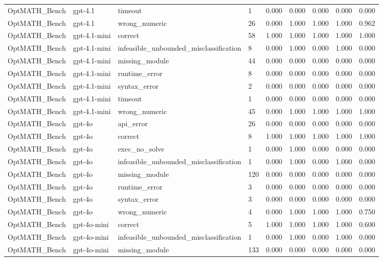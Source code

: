 \begin{table}[t]
\begin{tabular}{lllllllll}
OptMATH\_Bench & gpt-4.1 & timeout & 1 & 0.000 & 0.000 & 0.000 & 0.000 & 0.000 \\
OptMATH\_Bench & gpt-4.1 & wrong\_numeric & 26 & 0.000 & 1.000 & 1.000 & 1.000 & 0.962 \\
OptMATH\_Bench & gpt-4.1-mini & correct & 58 & 1.000 & 1.000 & 1.000 & 1.000 & 1.000 \\
OptMATH\_Bench & gpt-4.1-mini & infeasible\_unbounded\_misclassification & 8 & 0.000 & 1.000 & 0.000 & 1.000 & 0.000 \\
OptMATH\_Bench & gpt-4.1-mini & missing\_module & 44 & 0.000 & 0.000 & 0.000 & 0.000 & 0.000 \\
OptMATH\_Bench & gpt-4.1-mini & runtime\_error & 8 & 0.000 & 0.000 & 0.000 & 0.000 & 0.000 \\
OptMATH\_Bench & gpt-4.1-mini & syntax\_error & 2 & 0.000 & 0.000 & 0.000 & 0.000 & 0.000 \\
OptMATH\_Bench & gpt-4.1-mini & timeout & 1 & 0.000 & 0.000 & 0.000 & 0.000 & 0.000 \\
OptMATH\_Bench & gpt-4.1-mini & wrong\_numeric & 45 & 0.000 & 1.000 & 1.000 & 1.000 & 1.000 \\
OptMATH\_Bench & gpt-4o & api\_error & 26 & 0.000 & 0.000 & 0.000 & 0.000 & 0.000 \\
OptMATH\_Bench & gpt-4o & correct & 8 & 1.000 & 1.000 & 1.000 & 1.000 & 1.000 \\
OptMATH\_Bench & gpt-4o & exec\_no\_solve & 1 & 0.000 & 1.000 & 0.000 & 0.000 & 0.000 \\
OptMATH\_Bench & gpt-4o & infeasible\_unbounded\_misclassification & 1 & 0.000 & 1.000 & 0.000 & 1.000 & 0.000 \\
OptMATH\_Bench & gpt-4o & missing\_module & 120 & 0.000 & 0.000 & 0.000 & 0.000 & 0.000 \\
OptMATH\_Bench & gpt-4o & runtime\_error & 3 & 0.000 & 0.000 & 0.000 & 0.000 & 0.000 \\
OptMATH\_Bench & gpt-4o & syntax\_error & 3 & 0.000 & 0.000 & 0.000 & 0.000 & 0.000 \\
OptMATH\_Bench & gpt-4o & wrong\_numeric & 4 & 0.000 & 1.000 & 1.000 & 1.000 & 0.750 \\
OptMATH\_Bench & gpt-4o-mini & correct & 5 & 1.000 & 1.000 & 1.000 & 1.000 & 0.600 \\
OptMATH\_Bench & gpt-4o-mini & infeasible\_unbounded\_misclassification & 1 & 0.000 & 1.000 & 0.000 & 1.000 & 0.000 \\
OptMATH\_Bench & gpt-4o-mini & missing\_module & 133 & 0.000 & 0.000 & 0.000 & 0.000 & 0.000 \\

\end{tabular}
\end{table}
